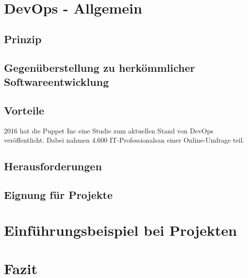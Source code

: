 \documentclass[praktikum,german]{hgbthesis}
\begin{document}
%

\chapter{DevOps - Allgemein}

\section{Prinzip}


\section{Gegenüberstellung zu herkömmlicher Softwareentwicklung}


\section{Vorteile}
2016 hat die Puppet Inc eine Studie zum aktuellen Stand von DevOps veröffentlicht. Dabei nahmen 4.600 \glqq IT-Professionals\grqq an einer Online-Umfrage teil.

\section{Herausforderungen}


\section{Eignung für Projekte}

%
%

\chapter{Einführungsbeispiel bei Projekten}


\chapter{Fazit}

\appendix


\MakeBibliography

\listoffigures
\listoftables
\end{document}
